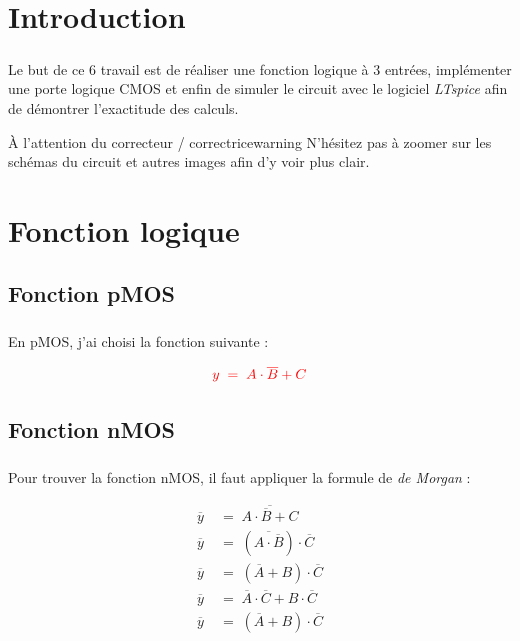\section{Introduction}

    \subparagraph{}Le but de ce {\color{info}6\ieme{} travail} est de réaliser une fonction logique à 3 entrées, 
    implémenter une porte logique CMOS et enfin de simuler le circuit avec le logiciel \textit{LTspice} afin de 
    démontrer l'exactitude des calculs.\\[1.5cm]
    
    \begin{titletbox}{À l'attention du correcteur / correctrice}{warning}
        N'hésitez pas à zoomer sur les schémas du circuit et autres images afin d'y voir plus clair.
    \end{titletbox}

    \section{Fonction logique}

    \subsection{Fonction pMOS}
    
        \subparagraph{}En pMOS, j'ai choisi la fonction suivante :
        
            \begin{equation*}
                \color{red}y\;=\;A \cdot \overline{B} + C
            \end{equation*}
            
    \subsection{Fonction nMOS}
    
    \subparagraph{}Pour trouver la fonction nMOS, il faut appliquer la formule de \textit{de Morgan} :
    
        {\color{green}\begin{align*}
            \overline{y}\;&=\;\overline{A \cdot \overline{B} + C} \\
            \overline{y}\;&=\;(\overline{A \cdot \overline{B}}) \cdot  \overline{C} \\
            \overline{y}\;&=\;(\overline{A} + {B}) \cdot  \overline{C} \\
            \overline{y}\;&=\;\overline{A} \cdot \overline{C} + B \cdot \overline{C} \\
            \overline{y}\;&=\;(\overline{A} + B) \cdot \overline{C}
        \end{align*}}
        
